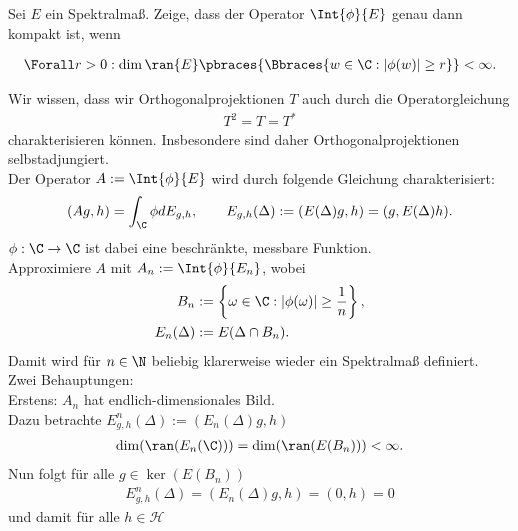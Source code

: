 \begin{exercise}[34/1]

Sei $E$ ein Spektralmaß.
Zeige, dass der Operator $\Int{\phi}{E}$ genau dann kompakt ist, wenn

\begin{align*}
  \Forall r > 0:
  \dim{\ran{E}}
  \pbraces
  {
    \Bbraces
    {
      w \in \C:
      |\phi(w)| \geq r
    }
  }
  < \infty.
\end{align*}

\end{exercise}

\begin{solution}

\phantom{}


Wir wissen, dass wir Orthogonalprojektionen $T$ auch durch die Operatorgleichung
\begin{align*}
  T^2 = T = T^*
\end{align*}
charakterisieren können. Insbesondere sind daher Orthogonalprojektionen selbstadjungiert. \\
Der Operator $A := \Int{\phi}{E}$ wird durch folgende Gleichung charakterisiert:
\begin{align}
  \left(Ag,h\right) = \int_{\C}\phi dE_{g,h}, \qquad E_{g,h}(\Delta) := (E(\Delta)g,h) = (g,E(\Delta)h).
\end{align}
$\phi: \C \to \C$ ist dabei eine beschränkte, messbare Funktion. \\
Approximiere $A$ mit $A_n := \Int{\phi}{E_n}$, wobei
\begin{align*}
  B_n &:= \left\{\omega \in \C: |\phi(\omega)| \geq \frac{1}{n}\right\}, \\
  E_n(\Delta) &:= E(\Delta \cap B_n).
\end{align*}
Damit wird für $n \in \N$ beliebig klarerweise wieder ein Spektralmaß definiert. \\
Zwei Behauptungen: \\
Erstens: $A_n$ hat endlich-dimensionales Bild. \\
Dazu betrachte $E_{g,h}^n(\Delta) := (E_n(\Delta)g,h)$
\begin{align*}
  \dim (\ran(E_n(\C))) = \dim (\ran(E(B_n))) < \infty.
\end{align*}
Nun folgt für alle $g \in \ker(E(B_n))$
\begin{align*}
  E_{g,h}^n(\Delta) = (E_n(\Delta)g,h) = (0,h) = 0
\end{align*}
und damit für alle $h \in \mathcal{H}$

\end{solution}
